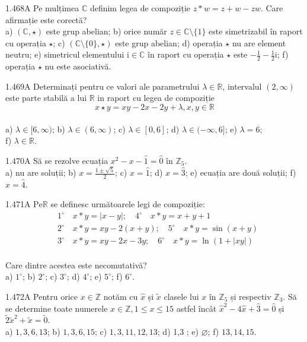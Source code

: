 \documentclass[11pt]{article}
\begin{document}
1.468A Pe mulțimea $\mathbb{C}$ definim legea de compoziție $z * w=z+w-z w$. Care afirmație este corectă?\\ a) $(\mathbb{C}, \star)$ este grup abelian; b) orice număr $z \in \mathbb{C} \setminus\{1\}$ este simetrizabil în raport cu operația $\star$; c) $(\mathbb{C} \setminus\{0\}, \star)$ este grup abelian; d) operația $\star$ nu are element neutru; e) simetricul elementului $\mathrm{i} \in \mathbb{C}$ în raport cu operația $\star$ este $-\frac{1}{2}-\frac{1}{2} \mathrm{i}$; f) operația $\star$ nu este asociativă.

1.469A Determinați pentru ce valori ale parametrului $\lambda \in \mathbb{R}$, intervalul $(2, \infty)$ este parte stabilă a lui $\mathbb{R}$ in raport cu legea de compoziție$$x \star y=x y-2 x-2 y+\lambda, x, y \in \mathbb{R}$$\\ a) $\lambda \in[6, \infty)$; b) $\lambda \in(6, \infty)$; c) $\lambda \in[0,6]$; d) $\lambda \in(-\infty, 6]$; e) $\lambda=6$;\\ f) $\lambda \in \mathbb{R}$.

1.470A Să se rezolve ecuația $x^{2}-x-\hat{1}=\hat{0}$ în $\mathbb{Z}_{5}$.\\ a) nu are soluții; b) $x=\frac{1 \pm \sqrt{5}}{2}$; c) $x=\hat{1}$; d) $x=\hat{3}$; e) ecuația are două soluții; f) $x=\hat{4}$.

1.471A $\mathrm{Pe} \mathbb{R}$ se definesc următoarele legi de compoziție: $$\begin{aligned}& 1^{\circ} \quad x * y=|x-y| ; \quad 4^{\circ} \quad x * y=x+y+1 \\& 2^{\circ} \quad x * y=x y-2(x+y) ; \quad 5^{\circ} \quad x * y=\sin (x+y) \\& 3^{\circ} \quad x * y=x y-2 x-3 y ; \quad 6^{\circ} \quad x * y=\ln (1+|x y|)\end{aligned}$$\\Care dintre acestea este necomutativă?\\ a) $1^{\circ}$; b) $2^{\circ}$; c) $3^{\circ}$; d) $4^{\circ}$; e) $5^{\circ}$; f) $6^{\circ}$.

1.472A Pentru orice $x \in \mathbb{Z}$ notăm cu $\hat{x}$ și $\tilde{x}$ clasele lui $x$ în $\mathbb{Z}_{5}$ și respectiv $\mathbb{Z}_{3}$. Să se determine toate numerele $x \in \mathbb{Z}, 1 \leq x \leq 15$ astfel încât $\hat{x}^{2}-4 \hat{x}+\hat{3}=\hat{0}$ și $\tilde{2} \tilde{x}^{2}+\tilde{x}=\tilde{0}$.\\ a) $1,3,6,13$; b) $1,3,6,15$; c) $1,3,11,12,13$; d) 1,3 ; e) $\varnothing$; f) $13,14,15$.
\end{document}
